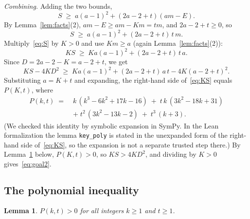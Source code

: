 \documentclass[11pt]{article}
\newtheorem{lemma}[theorem]{Lemma}
\theoremstyle{definition}
\theoremstyle{remark}
\begin{document}
\emph{Combining.} Adding the two bounds,
\[
  S \;\ge\; a(a-1)^2 + (2a - 2 + t)(am - E).
\]
By Lemma~\ref{lem:facts}(2), $am - E \ge am - Km = tm$, and
$2a-2+t \ge 0$, so
\begin{equation}\label{eq:S}
  S \;\ge\; a(a-1)^2 + (2a-2+t)\,t\,m.
\end{equation}
Multiply~\eqref{eq:S} by $K > 0$ and use $Km \ge a$ (again Lemma~\ref{lem:facts}(2)):
\[
  K S \;\ge\; K a (a-1)^2 + (2a-2+t)\,t\,a.
\]
Since $D = 2a - 2 - K = a - 2 + t$, we get
\begin{equation}\label{eq:KS}
  K S - 4 K D^2 \;\ge\; K a (a-1)^2 + (2a - 2 + t)\,a\,t - 4K(a - 2 + t)^2 .
\end{equation}
Substituting $a = K + t$ and expanding, the right-hand side
of~\eqref{eq:KS} equals $P(K,t)$, where
\begin{equation}\label{eq:P}
\begin{aligned}
  P(k,t) \;=\;& k\,(k^3 - 6k^2 + 17k - 16)
  \;+\; t\,k\,(3k^2 - 18k + 31) \\
  &+\; t^2\,(3k^2 - 13k - 2) \;+\; t^3\,(k+3).
\end{aligned}
\end{equation}
(We checked this identity by symbolic expansion in SymPy. In the Lean
formalization the lemma \texttt{key\_poly} is stated in the unexpanded form of
the right-hand side of~\eqref{eq:KS}, so the expansion is not a separate
trusted step there.) By
Lemma~\ref{lem:poly} below, $P(K,t) > 0$, so $K S > 4 K D^2$, and dividing
by $K > 0$ gives~\eqref{eq:goal2}.

\subsection{The polynomial inequality}

\begin{lemma}\label{lem:poly}
$P(k,t) > 0$ for all integers $k \ge 1$ and $t \ge 1$.
\end{lemma}
\end{document}
